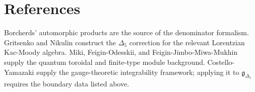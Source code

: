 \documentclass[11pt]{article}
\begin{document}
\section{References}
\label{sec:references}

Borcherds' automorphic products are the source of the denominator
formalism.  Gritsenko and Nikulin construct the \(\Delta_5\) correction
for the relevant Lorentzian Kac-Moody algebra.  Miki, Feigin-Odesskii,
and Feigin-Jimbo-Miwa-Mukhin supply the quantum toroidal and finite-type
module background.  Costello-Yamazaki supply the gauge-theoretic
integrability framework; applying it to \(\mathfrak g_{\Delta_5}\)
requires the boundary data listed above.
\end{document}
